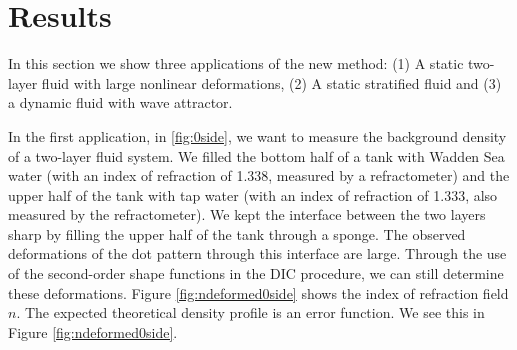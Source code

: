 \documentclass{article}
\begin{document}
\section{Results}
In this section we show three applications of the new method: (1) A static two-layer fluid with large nonlinear deformations, (2) A static stratified fluid and (3) a dynamic fluid with wave attractor.

In the first application, in \ref{fig:0side}, we want to measure the background density of a two-layer fluid system. We filled the bottom half of a tank with Wadden Sea water (with an index of refraction of 1.338, measured by a refractometer) and the upper half of the tank with tap water (with an index of refraction of 1.333, also measured by the refractometer). We kept the interface between the two layers sharp by filling the upper half of the tank through a sponge. The observed deformations of the dot pattern through this interface are large. Through the use of the second-order shape functions in the DIC procedure, we can still determine these deformations. Figure \ref{fig:ndeformed0side} shows the index of refraction field $n$. The expected theoretical density profile is an error function. We see this in Figure \ref{fig:ndeformed0side}.
\end{document}
